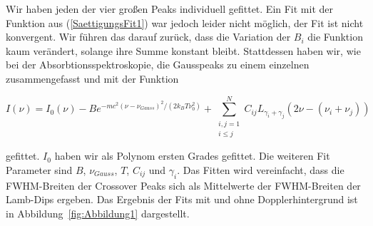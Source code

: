 \documentclass[a4paper,parskip]{scrartcl}
\begin{document}
Wir haben jeden der vier großen Peaks individuell gefittet. Ein Fit mit der Funktion aus (\ref{SaettigungsFit1}) war jedoch leider nicht möglich, der Fit ist nicht konvergent. Wir führen das darauf zurück, dass die Variation der $B_i$ die Funktion kaum verändert, solange ihre Summe konstant bleibt. Stattdessen haben wir, wie bei der Absorbtionsspektroskopie, die Gausspeaks zu einem einzelnen zusammengefasst und mit der Funktion

 \begin{equation}
I(\nu) = I_0(\nu)-B e^{-mc^2(\nu-\nu_{Gauss})^2/(2k_BT\nu_0^2)} +\sum_{\substack{i,j=1\\i\leq j}}^N C_{ij} L_{\gamma_i+\gamma_j}(2\nu-(\nu_i+\nu_j))
\label{SaettigungsFit2}
\end{equation}

gefittet. $I_0$ haben wir als Polynom ersten Grades gefittet. Die weiteren Fit Parameter sind $B$, $\nu_{Gauss}$, $T$, $C_{ij}$ und $\gamma_i$. Das Fitten wird vereinfacht, dass die FWHM-Breiten der Crossover Peaks sich als Mittelwerte der FWHM-Breiten der Lamb-Dips ergeben. Das Ergebnis der Fits mit und ohne Dopplerhintergrund ist in Abbildung~\ref{fig:Abbildung1} dargestellt.
\end{document}
